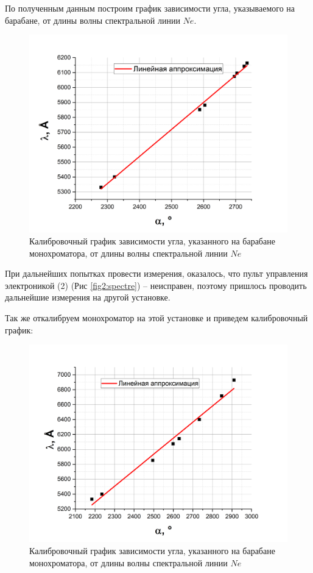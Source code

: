 \documentclass[a4paper,12pt]{article}
\begin{document}
По полученным данным построим график зависимости угла, указываемого на барабане, от длины волны спектральной линии $Ne$.

\begin{figure}[h!]
	\centering
	\includegraphics[width = 0.8\linewidth]{calibration_1}
	\caption{Калибровочный график зависимости угла, указанного на барабане монохроматора, от длины волны спектральной линии $Ne$}
	\label{graph1:calibration_1}
\end{figure}

\pagebreak

При дальнейших попытках провести измерения, оказалось, что пульт управления электроникой (2) (Рис \ref{fig2:spectre}) -- неисправен, поэтому пришлось проводить дальнейшие измерения на другой установке.

Так же откалибруем монохроматор на этой установке и приведем калибровочный график:

\begin{figure}[h!]
	\centering
	\includegraphics[width = \linewidth]{calibration_2}
	\caption{Калибровочный график зависимости угла, указанного на барабане монохроматора, от длины волны спектральной линии $Ne$}
	\label{graph2:calibration_2}
\end{figure}
\end{document}
